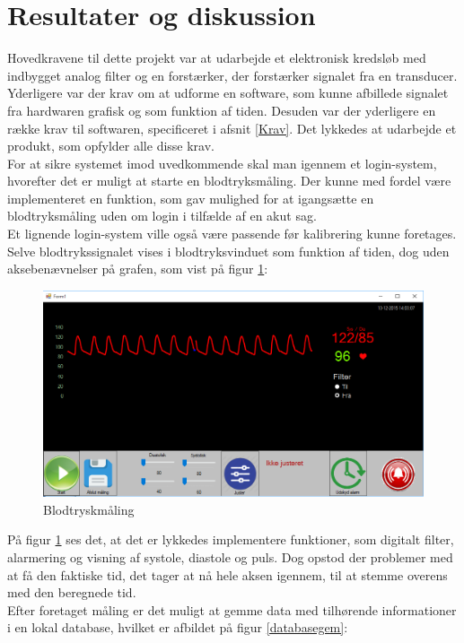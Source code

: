 \section{Resultater og diskussion}
Hovedkravene til dette projekt var at udarbejde et elektronisk kredsløb med indbygget analog filter og en forstærker, der forstærker signalet fra en transducer. Yderligere var der krav om at udforme en software, som kunne afbillede signalet fra hardwaren grafisk og som funktion af tiden. Desuden var der yderligere en række krav til softwaren, specificeret i afsnit \ref{Krav}. Det lykkedes at udarbejde et produkt, som opfylder alle disse krav. \\[1ex]
For at sikre systemet imod uvedkommende skal man igennem et login-system, hvorefter det er muligt at starte en blodtryksmåling. Der kunne med fordel være implementeret en funktion, som gav mulighed for at igangsætte en blodtryksmåling uden om login i tilfælde af en akut sag.\\ Et lignende login-system ville også være passende før kalibrering kunne foretages.\\
Selve blodtrykssignalet vises i blodtryksvinduet som funktion af tiden, dog uden aksebenævnelser på grafen, som vist på figur \ref{blodtryk}:

\begin{figure}[H]
	\centering
	\includegraphics[width=1\textwidth]{Figurer/SoftwareImplementering/blodtryk}
	\caption{Blodtryskmåling}
	\label{blodtryk}
\end{figure}

På figur \ref{blodtryk} ses det, at det er lykkedes implementere funktioner, som digitalt filter, alarmering og visning af systole, diastole og puls. Dog opstod der problemer med at få den faktiske tid, det tager at nå hele aksen igennem, til at stemme overens med den beregnede tid.\\
Efter foretaget måling er det muligt at gemme data med tilhørende informationer i en lokal database, hvilket er afbildet på figur \ref{databasegem}:

